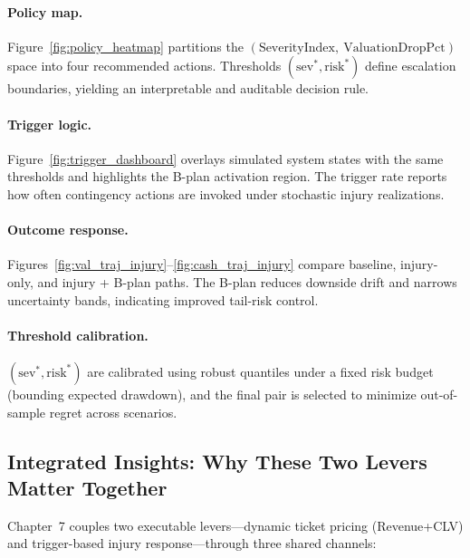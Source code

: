 \documentclass[12pt]{article}
\numberwithin{figure}{section}
\numberwithin{table}{section}
\begin{document}
	\paragraph{Policy map.}
	Figure~\ref{fig:policy_heatmap} partitions the $(\text{SeverityIndex},\ \text{ValuationDropPct})$ space into four recommended actions. 
	Thresholds $(\text{sev}^*,\text{risk}^*)$ define escalation boundaries, yielding an interpretable and auditable decision rule.
	
	\paragraph{Trigger logic.}
	Figure~\ref{fig:trigger_dashboard} overlays simulated system states with the same thresholds and highlights the B-plan activation region. 
	The trigger rate reports how often contingency actions are invoked under stochastic injury realizations.
	
	\paragraph{Outcome response.}
	Figures~\ref{fig:val_traj_injury}--\ref{fig:cash_traj_injury} compare baseline, injury-only, and injury + B-plan paths. 
	The B-plan reduces downside drift and narrows uncertainty bands, indicating improved tail-risk control.
	
	\paragraph{Threshold calibration.}
	$(\text{sev}^*,\text{risk}^*)$ are calibrated using robust quantiles under a fixed risk budget (bounding expected drawdown), and the final pair is selected to minimize out-of-sample regret across scenarios.
	
	
	\subsection{Integrated Insights: Why These Two Levers Matter Together}
	
	Chapter~7 couples two executable levers---dynamic ticket pricing (Revenue+CLV) and trigger-based injury response---through three shared channels:
	
\end{document}
